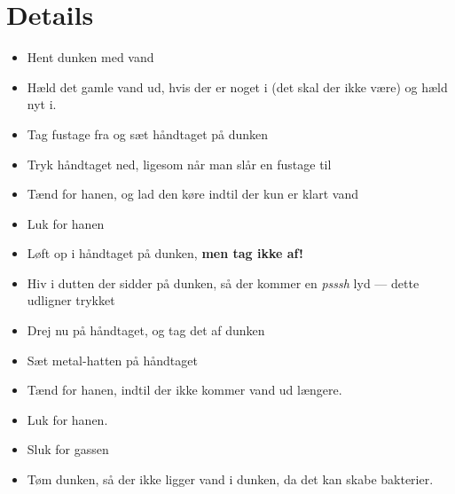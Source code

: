 \section{Details}
\begin{itemize}
  \item Hent dunken med vand
  \item Hæld det gamle vand ud, hvis der er noget i (det skal der ikke være) og hæld nyt i.
  \item Tag fustage fra og sæt håndtaget på dunken
  \item Tryk håndtaget ned, ligesom når man slår en fustage til
  \item Tænd for hanen, og lad den køre indtil der kun er klart vand
  \item Luk for hanen
  \item Løft op i håndtaget på dunken, \textbf{men tag ikke af!}
  \item Hiv i dutten der sidder på dunken, så der kommer en
    \textit{psssh} lyd --- dette udligner trykket
  \item Drej nu på håndtaget, og tag det af dunken
  \item Sæt metal-hatten på håndtaget
  \item Tænd for hanen, indtil der ikke kommer vand ud
    længere.
  \item Luk for hanen.
  \item Sluk for gassen
  \item Tøm dunken, så der ikke ligger vand i dunken, da det kan skabe bakterier.
\end{itemize}




